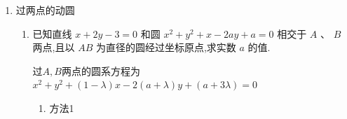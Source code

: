 \begin{enumerate}
\begin{enumerate}
\begin{jieda}
            故公共弦长$l = 2\sqrt{r^2-d^2} = 2\sqrt{5}$ .
        \end{jieda}
        \item 已知两圆 ${x}^{2} + {y}^{2} - {2x} - {6y} - 1 = 0$ 和 ${x}^{2} + {y}^{2} - {10x} - {12y} + m = 0$ . 求:
        \begin{enumerate}
            \item $m$ 取何值时两圆外切？
            \item 当 $m = {45}$ 时两圆的公共弦所在直线的方程和公共弦的长.
        \end{enumerate}
        \begin{jieda}
        两圆的标准方程分别为：
        
        ${\left( x - 1\right) }^{2} + {\left( y - 3\right) }^{2} = {11},$
        
        ${\left( x - 5\right) }^{2} + {\left( y - 6\right) }^{2} = {61} - m\left( {m < {61}}\right) ,$
        
        则圆心分别为 $\left( {1,3}\right) ,\left( {5,6}\right)$，半径分别为 $\sqrt{11}$ 和 $\sqrt{{61} - m}$ .
            \begin{enumerate}
                \item 当两圆外切时,
                
                $\sqrt{{\left( 5 - 1\right) }^{2} + {\left( 6 - 3\right) }^{2}} = \sqrt{11} + \sqrt{{61} - m}.$
                
                解得 $m = {25} + {10}\sqrt{11}$ .
                \item 两圆的公共弦所在直线的方程为
                
                $\left( {{x}^{2} + {y}^{2} - {2x} - {6y} - 1}\right)  - \left( {{x}^{2} + {y}^{2} - {10x} - {12y} + {45}}\right)  = 0$ ,即 ${4x} + {3y} - {23} = 0$ .
                
                所以公共弦的长为 $2 \times  \sqrt{{\left( \sqrt{11}\right) }^{2} - {\left( \dfrac{\left| 4 + 3 \times  3 - {23}\right| }{\sqrt{{4}^{2} + {3}^{2}}}\right) }^{2}} = 2\sqrt{7}$ .
            \end{enumerate}
        \end{jieda}
    \end{enumerate}

    \item 过两点的动圆
    \begin{enumerate}
        \item 已知直线 $x + {2y} - 3 = 0$ 和圆 ${x}^{2} + {y}^{2} + x - {2ay} + a = 0$ 相交于 $A$ 、 $B$ 两点,且以 ${AB}$ 为直径的圆经过坐标原点,求实数 $a$ 的值.
        \begin{jieda}
            过$A,B$两点的圆系方程为$x^2+y^2+(1-\lambda)x-2(a+\lambda)y+(a+3\lambda) = 0$
            \begin{enumerate}
                \item 方法1
                

\end{enumerate}
\end{jieda}
\end{enumerate}
\end{enumerate}
